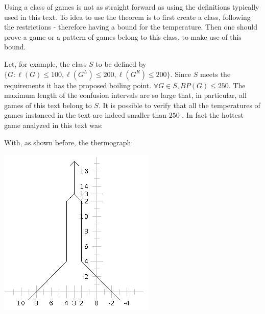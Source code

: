 Using a class of games is not as straight forward as using the definitions typically used in this text. To idea to use the theorem is to first create a class, following the restrictions - therefore having a bound for the temperature. Then one should prove a game or a pattern of games belong to this class, to make use of this bound.

Let, for example, the class $S$ to be defined by $\{G : \ell(G)\leq100, \ell(G^L)\leq200, \ell(G^R)\leq200\}$. Since $S$ meets the requirements it has the proposed boiling point. $\forall G \in S, BP(G) \leq 250$. The maximum length of the confusion intervals are so large that, in particular, all games of this text belong to $S$. It is possible to verify that all the temperatures of games instanced in the text are indeed smaller than $250$ . In fact the hottest game \Gm{} analyzed in this text was:

\begin{center}
\end{center}

With, as shown before, the thermograph:
\begin{center}
	\includegraphics[scale=0.5]{../images/thermA.png}
\end{center}

